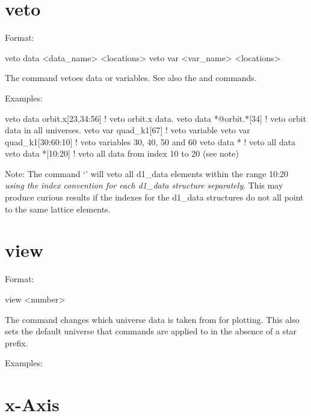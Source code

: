 {{{{%
\section{veto}
\label{s:veto}

Format:
\begin{example}
  veto data <data_name> <locations>
  veto var <var_name> <locations>
\end{example}

\vskip 0.2in 
The  command vetoes data or variables. See also the
 and  commands.

Examples:
\begin{example}
  veto data orbit.x[23,34:56]  ! veto orbit.x data.
  veto data *@orbit.*[34]      ! veto orbit data in all universes.
  veto var quad_k1[67]         ! veto variable
  veto var quad_k1[30:60:10]   ! veto variables 30, 40, 50 and 60
  veto data *                  ! veto all data
  veto data *[10:20]           ! veto all data from index 10 to 20 (see note)
\end{example}

Note: The command `' will veto all d1\_data elements
within the range 10:20 \textit{using the index convention for each d1\_data
structure separately}. This may produce curious results if the
indexes for the d1\_data structures do not all point to the same lattice
elements. 

\section{view}
\label{s:view}

Format:
\begin{example}
  view <number>
\end{example}

\vskip 0.2in 
The  command changes which universe data is taken from for
plotting.  This also sets the default universe that commands are
applied to in the absence of a star prefix.

Examples:

\section{x-Axis}
\label{s:x.axis}

}}}}
